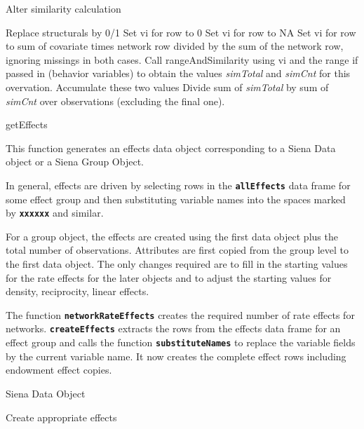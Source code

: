 \documentclass[12pt,a4paper]{article}
\makeatletter
\renewcommand{\=}{\,=\,}
\newcommand{\+}{\,+\,}
\newcommand{\nnm}[1]{\textsf{\small\textit{#1}}}
\renewcommand{\section}{\@startsection{section}{1}
                {0pt}{\baselineskip}{0.5\baselineskip}
                {\centering\sffamily} }
\renewcommand{\subsection}{\@startsection{subsection}{2}
                {0pt}{0.7\baselineskip}{0.3\baselineskip}
                {\sffamily} }
\renewcommand{\subsubsection}{\@startsection{subsubsection}{3}
                {0pt}{0.5\baselineskip}{0.3\baselineskip}
                {\it\sffamily} }
\newcommand{\sfn}[1]{\textbf{\texttt{#1}}}
\makeatother
\begin{document}
\subsubsection{Alter similarity calculation}
\label{sec:simdist2}
\begin{algorithmic}
\STATE Replace structurals by 0/1
\STATE Set vi for row to 0
\STATE Set vi for row to NA
\ELSE
\STATE Set vi for row to sum of covariate times network row divided by the sum
of the network row, ignoring missings in both cases.
\ENDIF
\ENDFOR
\STATE Call rangeAndSimilarity using vi and the range if passed in (behavior
variables) to obtain the values \nnm{simTotal} and \nnm{simCnt} for this
overvation.
\STATE Accumulate these two values
\ENDFOR
Divide sum of \nnm{simTotal} by sum of \nnm{simCnt} over observations (excluding
the final one).
\end{algorithmic}
\section{getEffects}

This function generates an effects data object corresponding to a Siena Data
object or a Siena Group Object.

In general, effects are driven by selecting rows in the \sfn{allEffects} data
frame for some effect group and then substituting variable names into the spaces
marked by \sfn{xxxxxx} and similar.

For a group object, the effects are created using the first data object plus the
total number of observations. Attributes are first copied from the group level
to the first data object. The only changes required are to fill in the starting
values for the rate effects for the later objects and to adjust the starting
values for density, reciprocity, linear effects.

The function \sfn{networkRateEffects} creates the required number of rate
effects for networks.  \sfn{createEffects} extracts the rows from the effects
data frame for an effect group and calls the function \sfn{substituteNames} to
replace the variable fields by the current variable name. It now creates the
complete effect rows including endowment effect copies.

\subsection{Siena Data Object}
\begin{algorithmic}
\STATE Create appropriate effects
\ENDFOR
\end{algorithmic}
\end{document}
